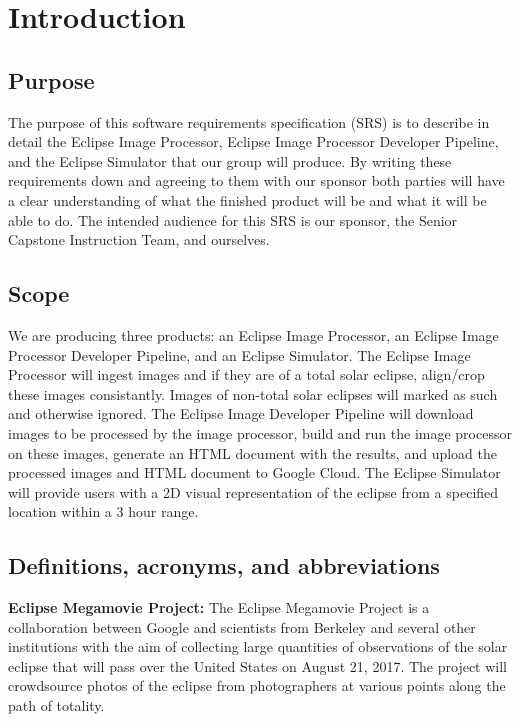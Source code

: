 \documentclass[10pt, onecolumn, draftclsnofoot, letterpaper, compsoc]{IEEEtran}
\begin{document}
\section{Introduction}

\subsection{Purpose}
The purpose of this software requirements specification (SRS) is to describe in
detail the Eclipse Image Processor, Eclipse Image Processor Developer Pipeline,
and the Eclipse Simulator that our group will
produce. By writing these requirements down and agreeing to them with our
sponsor both parties will have a clear understanding of what the finished
product will be and what it will be able to do. The intended audience for this
SRS is our sponsor, the Senior Capstone Instruction Team, and ourselves.

\subsection{Scope}
We are producing three products: an Eclipse Image Processor, an Eclipse
Image Processor Developer Pipeline, and an Eclipse
Simulator. The Eclipse Image Processor will ingest images and if
they are of a total solar eclipse, align/crop these images consistantly.
Images of non-total solar eclipses will marked as such and otherwise ignored.
The Eclipse Image Developer Pipeline
will download images to be processed by the image processor, build and run the
image processor on these images, generate an HTML document with the results,
and upload the processed images and HTML document to Google Cloud. The Eclipse
Simulator will provide users with a 2D visual representation of the eclipse from a
specified location within a 3 hour range.

\subsection{Definitions, acronyms, and abbreviations}

	\textbf{Eclipse Megamovie Project:}
	The Eclipse Megamovie Project is a collaboration between Google
	and scientists from Berkeley and several other institutions with the
	aim of collecting large quantities of observations of the solar eclipse
	that will pass over the United States on August 21, 2017. The project
	will crowdsource photos of the eclipse from photographers at various
	points along the path of totality. \\
\end{document}

